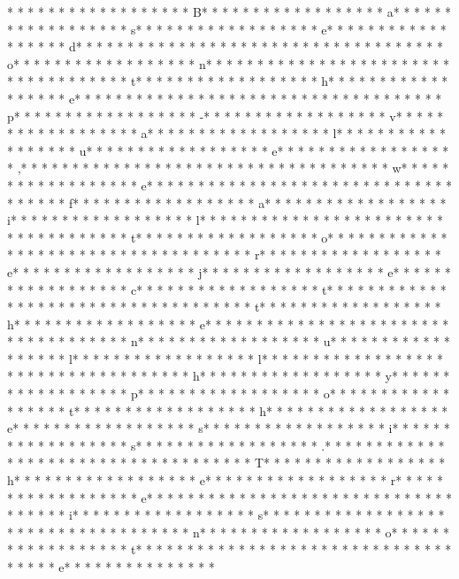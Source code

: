 * * *  * * *  * * *  *  * * *  *  * * *  * B* * *  * * *  * * *  *  * * *  *  * * *  * a* * *  * * *  * * *  *  * * *  *  * * *  * s* * *  * * *  * * *  *  * * *  *  * * *  * e* * *  * * *  * * *  *  * * *  *  * * *  * d* * *  * * *  * * *  *  * * *  *  * * *  *  * * *  * * *  * * *  *  * * *  *  * * *  * o* * *  * * *  * * *  *  * * *  *  * * *  * n* * *  * * *  * * *  *  * * *  *  * * *  *  * * *  * * *  * * *  *  * * *  *  * * *  * t* * *  * * *  * * *  *  * * *  *  * * *  * h* * *  * * *  * * *  *  * * *  *  * * *  * e* * *  * * *  * * *  *  * * *  *  * * *  *  * * *  * * *  * * *  *  * * *  *  * * *  * p* * *  * * *  * * *  *  * * *  *  * * *  * -* * *  * * *  * * *  *  * * *  *  * * *  * v* * *  * * *  * * *  *  * * *  *  * * *  * a* * *  * * *  * * *  *  * * *  *  * * *  * l* * *  * * *  * * *  *  * * *  *  * * *  * u* * *  * * *  * * *  *  * * *  *  * * *  * e* * *  * * *  * * *  *  * * *  *  * * *  * ,* * *  * * *  * * *  *  * * *  *  * * *  *  * * *  * * *  * * *  *  * * *  *  * * *  * w* * *  * * *  * * *  *  * * *  *  * * *  * e* * *  * * *  * * *  *  * * *  *  * * *  *  * * *  * * *  * * *  *  * * *  *  * * *  * f* * *  * * *  * * *  *  * * *  *  * * *  * a* * *  * * *  * * *  *  * * *  *  * * *  * i* * *  * * *  * * *  *  * * *  *  * * *  * l* * *  * * *  * * *  *  * * *  *  * * *  *  * * *  * * *  * * *  *  * * *  *  * * *  * t* * *  * * *  * * *  *  * * *  *  * * *  * o* * *  * * *  * * *  *  * * *  *  * * *  *  * * *  * * *  * * *  *  * * *  *  * * *  * r* * *  * * *  * * *  *  * * *  *  * * *  * e* * *  * * *  * * *  *  * * *  *  * * *  * j* * *  * * *  * * *  *  * * *  *  * * *  * e* * *  * * *  * * *  *  * * *  *  * * *  * c* * *  * * *  * * *  *  * * *  *  * * *  * t* * *  * * *  * * *  *  * * *  *  * * *  *  * * *  * * *  * * *  *  * * *  *  * * *  * t* * *  * * *  * * *  *  * * *  *  * * *  * h* * *  * * *  * * *  *  * * *  *  * * *  * e* * *  * * *  * * *  *  * * *  *  * * *  *  * * *  * * *  * * *  *  * * *  *  * * *  * n* * *  * * *  * * *  *  * * *  *  * * *  * u* * *  * * *  * * *  *  * * *  *  * * *  * l* * *  * * *  * * *  *  * * *  *  * * *  * l* * *  * * *  * * *  *  * * *  *  * * *  *  * * *  * * *  * * *  *  * * *  *  * * *  * h* * *  * * *  * * *  *  * * *  *  * * *  * y* * *  * * *  * * *  *  * * *  *  * * *  * p* * *  * * *  * * *  *  * * *  *  * * *  * o* * *  * * *  * * *  *  * * *  *  * * *  * t* * *  * * *  * * *  *  * * *  *  * * *  * h* * *  * * *  * * *  *  * * *  *  * * *  * e* * *  * * *  * * *  *  * * *  *  * * *  * s* * *  * * *  * * *  *  * * *  *  * * *  * i* * *  * * *  * * *  *  * * *  *  * * *  * s* * *  * * *  * * *  *  * * *  *  * * *  * .* * *  * * *  * * *  *  * * *  *  * * *  *  * * *  * * *  * * *  *  * * *  *  * * *  * T* * *  * * *  * * *  *  * * *  *  * * *  * h* * *  * * *  * * *  *  * * *  *  * * *  * e* * *  * * *  * * *  *  * * *  *  * * *  * r* * *  * * *  * * *  *  * * *  *  * * *  * e* * *  * * *  * * *  *  * * *  *  * * *  *  * * *  * * *  * * *  *  * * *  *  * * *  * i* * *  * * *  * * *  *  * * *  *  * * *  * s* * *  * * *  * * *  *  * * *  *  * * *  *  * * *  * * *  * * *  *  * * *  *  * * *  * n* * *  * * *  * * *  *  * * *  *  * * *  * o* * *  * * *  * * *  *  * * *  *  * * *  * t* * *  * * *  * * *  *  * * *  *  * * *  *  * * *  * * *  * * *  *  * * *  *  * * *  * e* * *  * * *  * * *  *  * * *  *  * 